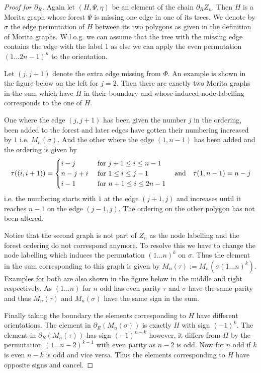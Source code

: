 \begin{proof}[Proof for $\partial_{R}$]
	Again let $(H,\Psi,\eta)$ be an element of the chain $\partial_{R} Z_{n}$.
	Then $H$ is a Morita graph whose forest $\Psi$ is missing one edge in one of its trees.
	We denote by $\sigma$ the edge permutation of $H$ between its two polygons as given in the definition of Morita graphs.
	W.l.o.g. we can assume that the tree with the missing edge contains the 
	edge with the label $1$ as else we can apply the even permutation $(1 \ldots 2n-1)^{n}$ to the orientation.
	
	Let $(j,j+1)$ denote the extra edge missing from  $\Phi$. An example is shown in the figure below on the left for $j = 2$.
	Then there are exactly two Morita graphs in the sum which have $H$ in their boundary and whose induced node labelling corresponds to the one of $H$.

	One where the edge $(j,j+1)$ has been given the number $j$ in the ordering, been added to the forest and later edges have gotten their numbering increased by $1$
	i.e. $M_{n}(\sigma)$.
	And the other where the edge $(1,n-1)$ has been added and the ordering is given by
	\[
		\tau((i,i+1)) = \begin{cases}
			i-j & \text{ for } j+1 \leq i \leq n-1\\
			n-j+i & \text{ for } 1 \leq i \leq j-1\\
			i-1 & \text{ for } n+1 \leq i \leq 2n-1
		\end{cases} \qq{and} \tau(1,n-1) = n-j
	\] i.e. the numbering starts with $1$ at the edge $(j+1,j)$ and increases until it reaches $n-1$ on the edge  $(j-1,j)$. 
	The ordering on the other polygon has not been altered.
	
	Notice that the second graph is not part of $Z_{n}$ as the node labelling and the forest ordering do not correspond anymore. 
	To resolve this we have to change the node labelling which induces the permutation $(1 \ldots n)^{k}$ on $\sigma$.
	Thus the element in the sum corresponding to this graph is given by  $M_{n}(\tau) := M_{n}(\sigma (1 \ldots n)^{k})$.
	Examples for both are also shown in the figure below in the middle and right respectively.
	As $(1 \ldots n)$ for $n$ odd has even parity $\tau$ and $\sigma$ have the same parity and thus $M_{n}(\tau)$ and $M_{n}(\sigma)$ have the same sign
	in the sum. 
	
	Finally taking the boundary the elements corresponding to $H$ have different orientations.
	The element in $\partial_{R}(M_{n}(\sigma))$ is exactly $H$ with sign $(-1)^{k}$. The element in $\partial_{R}(M_{n}(\tau))$ has sign $(-1)^{n-k}$ however, it 
	differs from $H$ by the permutation $(1 \ldots n-2)^{k - 1}$ with even parity as $n-2$ is odd.
	Now for $n$ odd if $k$ is even $n-k$ is odd and vice versa. Thus the elements corresponding to $H$ have opposite signs and cancel.


\end{proof}
